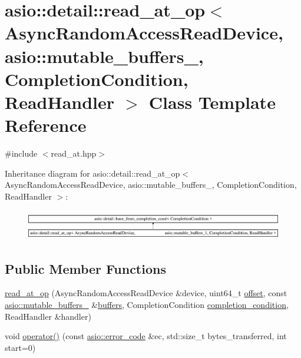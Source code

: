 \hypertarget{classasio_1_1detail_1_1read__at__op_3_01_async_random_access_read_device_00_01_01_01_01_01_01_01ccd5681b695707fee491134502088d0f}{}\section{asio\+:\+:detail\+:\+:read\+\_\+at\+\_\+op$<$ Async\+Random\+Access\+Read\+Device, asio\+:\+:mutable\+\_\+buffers\+\_, Completion\+Condition, Read\+Handler $>$ Class Template Reference}
\label{classasio_1_1detail_1_1read__at__op_3_01_async_random_access_read_device_00_01_01_01_01_01_01_01ccd5681b695707fee491134502088d0f}


{\ttfamily \#include $<$read\+\_\+at.\+hpp$>$}

Inheritance diagram for asio\+:\+:detail\+:\+:read\+\_\+at\+\_\+op$<$ Async\+Random\+Access\+Read\+Device, asio\+:\+:mutable\+\_\+buffers\+\_, Completion\+Condition, Read\+Handler $>$\+:\begin{figure}[H]
\begin{center}
\leavevmode
\includegraphics[height=1.327014cm]{classasio_1_1detail_1_1read__at__op_3_01_async_random_access_read_device_00_01_01_01_01_01_01_01ccd5681b695707fee491134502088d0f}
\end{center}
\end{figure}
\subsection*{Public Member Functions}
\begin{DoxyCompactItemize}
\item 
\hyperlink{classasio_1_1detail_1_1read__at__op_3_01_async_random_access_read_device_00_01_01_01_01_01_01_01ccd5681b695707fee491134502088d0f_a521e1379600afb8133138fe33d606f90}{read\+\_\+at\+\_\+op} (Async\+Random\+Access\+Read\+Device \&device, uint64\+\_\+t \hyperlink{group__async__read__at_ga8dcdb41a4adfd6fe5322b5dd666d9f29}{offset}, const \hyperlink{classasio_1_1mutable__buffers__1}{asio\+::mutable\+\_\+buffers\+\_} \&\hyperlink{group__async__read_ga54dede45c3175148a77fe6635222c47d}{buffers}, Completion\+Condition \hyperlink{group__async__read_gae2e215d5013596cc2b385bb6c13fa518}{completion\+\_\+condition}, Read\+Handler \&handler)
\item 
void \hyperlink{classasio_1_1detail_1_1read__at__op_3_01_async_random_access_read_device_00_01_01_01_01_01_01_01ccd5681b695707fee491134502088d0f_abdf76ca48136b3122f4dbb5ac1c3383c}{operator()} (const \hyperlink{classasio_1_1error__code}{asio\+::error\+\_\+code} \&ec, std\+::size\+\_\+t bytes\+\_\+transferred, int start=0)
\end{DoxyCompactItemize}
